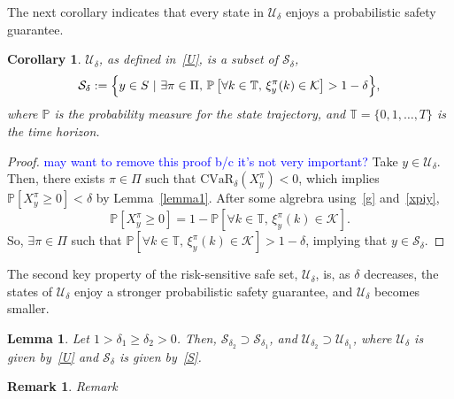\documentclass[letterpaper, 10 pt, conference]{ieeeconf}  %
\newtheorem{corollary}{Corollary}
\newtheorem{lemma}{Lemma}
\newtheorem{remark}{Remark}
\begin{document}
The next corollary indicates that every state in $\mathcal{U}_\delta$ enjoys a probabilistic safety guarantee.
\begin{corollary}
$\mathcal{U}_\delta$, as defined in~\eqref{U}, is a subset of $\mathcal{S}_\delta$,
\begin{equation}
\mathcal{S}_\delta := \Big\{y \in S\text{ }|\text{ }\exists \pi \in \Pi\text{, } \mathbb{P}\left[\forall k \in \mathbb{T}\text{, }\xi_y^\pi(k) \in \mathcal{K} \right]  > 1-\delta \Big\}, \\
\label{S}\end{equation}
where $\mathbb{P}$ is the probability measure for the state trajectory, and $\mathbb{T} = \{0, 1, \dots, T\}$ is the time horizon.
\end{corollary}
\begin{proof}
\textcolor{blue}{may want to remove this proof b/c it's not very important?}
Take $y \in \mathcal{U}_\delta$. Then, there exists $\pi \in \Pi$ such that $\text{CVaR}_\delta(X_y^\pi) < 0$, 
which implies $\mathbb{P}[X_y^\pi \geq 0] < \delta$ by Lemma~\ref{lemma1}.
After some algrebra using~\eqref{g} and~\eqref{xpiy},
\begin{equation}
\mathbb{P}[X_y^\pi \geq 0] = 1 - \mathbb{P}\left[\forall k \in \mathbb{T}\text{, } \xi_y^\pi(k) \in \mathcal{K} \right].
\end{equation}
So, $\exists \pi \in \Pi$ such that $\mathbb{P}\left[\forall k \in \mathbb{T}\text{, } \xi_y^\pi(k) \in \mathcal{K} \right] > 1- \delta$, implying that $y \in \mathcal{S}_\delta$.
\end{proof}
The second key property of the risk-sensitive safe set, $\mathcal{U}_\delta$, is, as $\delta$ decreases,
the states of $\mathcal{U}_\delta$ enjoy a stronger probabilistic safety guarantee, and $\mathcal{U}_\delta$ becomes smaller.
\begin{lemma}\label{lemma2}
Let $1>\delta_1 \geq \delta_2>0$. Then, $\mathcal{S}_{\delta_2} \supset \mathcal{S}_{\delta_1}$,
and $\mathcal{U}_{\delta_2} \supset \mathcal{U}_{\delta_1}$, where $\mathcal{U}_{\delta}$ is given by~\eqref{U}
and $\mathcal{S}_{\delta}$ is given by~\eqref{S}. 
\end{lemma}
\begin{remark}{Remark}

\end{remark}
\end{document}
